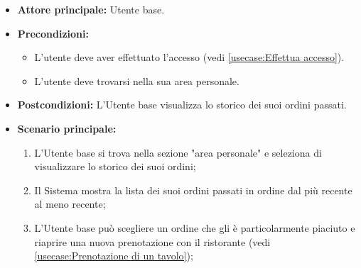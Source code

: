 \label{usecase:Storico ordini}
\begin{itemize}
	\item \textbf{Attore principale:} Utente base.

	\item \textbf{Precondizioni:}
	\begin{itemize}
        \item L'utente deve aver effettuato l'accesso (vedi \autoref{usecase:Effettua accesso}).
        \item L'utente deve trovarsi nella sua area personale.
    \end{itemize}

	\item \textbf{Postcondizioni:} L'Utente base visualizza lo storico dei suoi ordini passati.

	\item \textbf{Scenario principale:}
	      \begin{enumerate}
		      \item L'Utente base si trova nella sezione "area personale" e seleziona di visualizzare lo storico dei suoi ordini;
		      \item Il Sistema mostra la lista dei suoi ordini passati in ordine dal più recente al meno recente;
              \item L'Utente base può scegliere un ordine che gli è particolarmente piaciuto e riaprire una nuova prenotazione con il ristorante (vedi \autoref{usecase:Prenotazione di un tavolo});
	      \end{enumerate}
\end{itemize}
